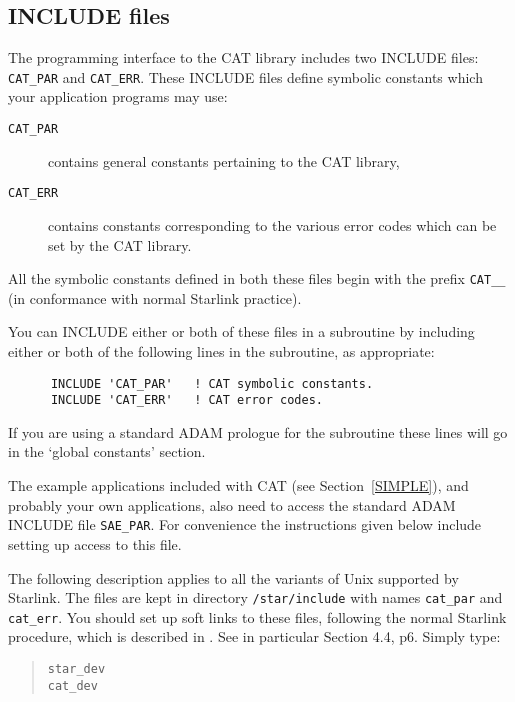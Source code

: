 \subsection{\label{INCLUDE}INCLUDE files}

The programming interface to the CAT library includes two INCLUDE files:
{\tt CAT\_PAR} and {\tt CAT\_ERR}. These INCLUDE files define symbolic
constants which your application programs may use:

\begin{description}

  \item[{\tt CAT\_PAR}] contains general constants pertaining to the
   CAT library,

  \item[{\tt CAT\_ERR}] contains constants corresponding to the various 
   error codes which can be set by the CAT library.

\end{description}

All the symbolic constants defined in both these files begin with the 
prefix {\tt CAT\_\_} (in conformance with normal Starlink practice).

You can INCLUDE either or both of these files in a subroutine by
including either or both of the following lines in the subroutine,
as appropriate:

\begin{verbatim}
      INCLUDE 'CAT_PAR'   ! CAT symbolic constants.
      INCLUDE 'CAT_ERR'   ! CAT error codes.
\end{verbatim}

If you are using a standard ADAM prologue for the subroutine these 
lines will go in the `global constants' section.

The example applications included with CAT (see Section~\ref{SIMPLE}),
and probably your own applications, also need to access the standard
ADAM INCLUDE file {\tt SAE\_PAR}. For convenience the instructions
given below include setting up access to this file.

The following description applies to all the variants of Unix supported
by Starlink.  The files are kept in 
directory {\tt /star/include} with names {\tt cat\_par} and {\tt 
cat\_err}. You should set up soft links to these files, following the 
normal Starlink procedure, which is described in
\cite{SUN111}.  See in particular Section 4.4,
p6.  Simply type:

\begin{verse}
  {\tt star\_dev \\
  cat\_dev}
\end{verse}

